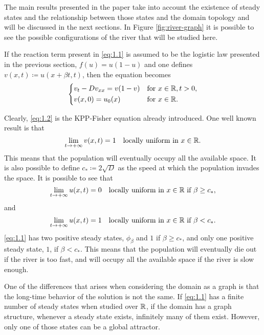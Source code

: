 The main results presented in the paper take into account the existence of steady states and the relationship between those states and the domain topology and will be discussed in the next sections.
In Figure \ref{fig:river-graph} it is possible to see the possible configurations of the river that will be studied here. 

If the reaction term present in \eqref{eq:1.1} is assumed to be the logistic law presented in the previous section, \(f(u) = u(1 - u)\) and one defines \(v(x, t) \coloneqq u(x + \beta t, t)\), then the equation becomes
\begin{equation}
    \begin{dcases}
        v_t - Dv_{xx} = v(1 - v) & \text{for } x \in \mathbb{R}, t > 0, \\
        v(x, 0) = u_0(x) & \text{for } x \in \mathbb{R}.
    \end{dcases}
    \label{eq:1.2}
\end{equation}

Clearly, \eqref{eq:1.2} is the KPP-Fisher equation already introduced. One well known result is that 
\begin{equation*}
    \lim_{t \to +\infty} v(x, t) = 1 \quad \text{locally uniform in } x \in \mathbb{R}.
\end{equation*}
This means that the population will eventually occupy all the available space.
It is also possible to define \(c_* \coloneqq 2\sqrt{D} \) as the speed at which the population invades the space. It is possible to see that 
\[
    \lim_{t \to +\infty} u(x, t) = 0 \quad \text{locally uniform in } x \in \mathbb{R} \text{ if } \beta \geq c_*,
\]
and
\[
    \lim_{t \to +\infty} u(x, t) = 1 \quad \text{locally uniform in } x \in \mathbb{R} \text{ if } \beta < c_*.
\]
\eqref{eq:1.1} has two positive steady states, \(\phi_\beta\) and \(1\) if \(\beta \geq c_*\), and only one positive steady state, \(1\), if \(\beta < c_*\). 
This means that the population will eventually die out if the river is too fast, and will occupy all the available space if the river is slow enough.

One of the differences that arises when considering the domain as a graph is that the long-time behavior of the solution is not the same. If \eqref{eq:1.1} has a finite number of steady states when studied over \(\mathbb{R}\), if the domain has a graph structure, whenever a steady state exists, infinitely many of them exist. However, only one of those states can be a global attractor. 

